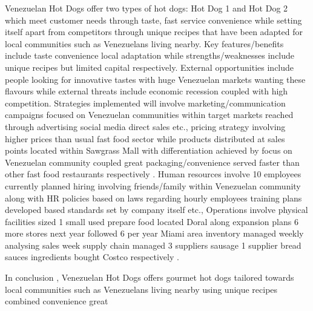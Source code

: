Venezuelan Hot Dogs offer two types of hot dogs: Hot Dog 1 and Hot Dog 2 which meet customer needs through taste, fast service convenience while setting itself apart from competitors through unique recipes that have been adapted for local communities such as Venezuelans living nearby. Key features/benefits include taste convenience local adaptation while strengths/weaknesses include unique recipes but limited capital respectively. External opportunities include people looking for innovative tastes with huge Venezuelan markets wanting these flavours while external threats include economic recession coupled with high competition. Strategies implemented will involve marketing/communication campaigns focused on Venezuelan communities within target markets reached through advertising social media direct sales etc., pricing strategy involving higher prices than usual fast food sector while products distributed at sales points located within Sawgrass Mall with differentiation achieved by focus on Venezuelan community coupled great packaging/convenience served faster than other fast food restaurants respectively . Human resources involve 10 employees currently planned hiring involving friends/family within Venezuelan community along with HR policies based on laws regarding hourly employees training plans developed based standards set by company itself etc., Operations involve physical facilities sized 1 small used prepare food located Doral along expansion plans 6 more stores next year followed 6 per year Miami area inventory managed weekly analysing sales week supply chain managed 3 suppliers sausage 1 supplier bread sauces ingredients bought Costco respectively .  

In conclusion , Venezuelan Hot Dogs offers gourmet hot dogs tailored towards local communities such as Venezuelans living nearby using unique recipes combined convenience great